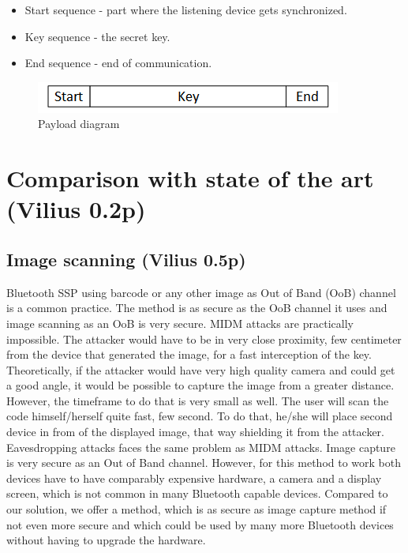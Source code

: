 \documentclass[12pt]{article}
\begin{document}
\begin{itemize}
    \item Start sequence - part where the listening device gets synchronized.
    \item Key sequence - the secret key.
    \item End sequence - end of communication.
\end{itemize}

\begin{figure}[h!]
    \includegraphics[scale=1]{fig/payload.png}
    \caption{Payload diagram}
\end{figure}


\newpage

\section{Comparison with state of the art (Vilius 0.2p)}
\label{sec:Comparison with state of the art}

\subsection{Image scanning (Vilius 0.5p)}
\label{sub:Image scanning}

Bluetooth SSP using barcode or any other image as Out of Band (OoB) channel is a common practice. The method is as secure as the OoB channel it uses and image scanning as an OoB is very secure. MIDM attacks are practically impossible. The attacker would have to be in very close proximity, few centimeter from the device that generated the image, for a fast interception of the key. Theoretically, if the attacker would have very high quality camera and could get a good angle, it would be possible to capture the image from a greater distance. However, the timeframe to do that is very small as well. The user will scan the code himself/herself quite fast, few second. To do that, he/she will place second device in from of the displayed image, that way shielding it from the attacker. Eavesdropping attacks faces the same problem as MIDM attacks.
Image capture is very secure as an Out of Band channel. However, for this method to work both devices have to have comparably expensive hardware, a camera and a display screen, which is not common in many Bluetooth capable devices. Compared to our solution, we offer a method, which is as secure as image capture method if not even more secure and which could be used by many more Bluetooth devices without having to upgrade the hardware.
\end{document}
